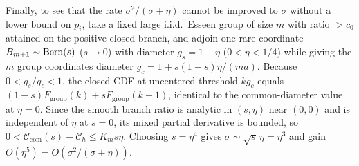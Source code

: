 Finally, to see that the rate $\sigma^2/(\sigma+\eta)$ cannot be improved to
$\sigma$ without a lower bound on $p_i$, take a fixed large i.i.d.\ Esseen
group of size $m$ with ratio $>c_0$ attained on the positive closed branch,
and adjoin one rare coordinate $B_{m+1}\sim\operatorname{Bern}(s)$ ($s\to0$) with diameter
$g_s=1-\eta$ ($0<\eta<1/4$) while giving the $m$ group coordinates diameter
$g_c=1+s(1-s)\eta/(ma)$. Because $0<g_s/g_c<1$, the closed CDF at uncentered
threshold $kg_c$ equals $(1-s)F_{\mathrm{group}}(k)+sF_{\mathrm{group}}(k-1)$,
identical to the common-diameter value at $\eta=0$. Since the smooth branch
ratio is analytic in $(s,\eta)$ near $(0,0)$ and is independent of $\eta$ at
$s=0$, its mixed partial derivative is bounded, so
$0<\mathcal C_{\mathrm{com}}(s)-\mathcal C_h\le K_m s\eta$. Choosing $s=\eta^4$
gives $\sigma\sim\sqrt s\,\eta=\eta^3$ and gain $O(\eta^5)=O(\sigma^2/(\sigma+\eta))$.
